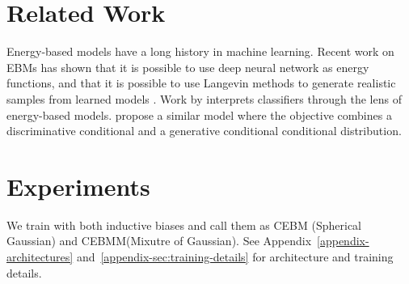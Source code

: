 \documentclass[tablecaption=bottom,wcp]{jmlr} %
\begin{document}


\vspace*{-0.5ex}
\section{Related Work}
\label{sec:related-work}
\vspace*{-1.5ex}
Energy-based models \cite{lecun2006tutorial} have a long history in machine learning. Recent work on EBMs has shown that it is possible to use deep neural network as energy functions, and that it is possible to use Langevin methods to generate realistic samples from learned models \cite{nijkamp2019anatomy, nijkamp2019learning, du2019implicit,xie2016theory}. Work by \citet{grathwohl2019your} interprets classifiers through the lens of energy-based models. \citet{liu2020hybrid} propose a similar model where the objective combines a discriminative conditional and a generative conditional conditional distribution.

\vspace*{-0.5ex}
\section{Experiments}
\label{sec:experiments}
We train with both inductive biases and call them as CEBM (Spherical Gaussian) and CEBMM(Mixutre of Gaussian). See Appendix~\ref{appendix-architectures} and~\ref{appendix-sec:training-details} for architecture and training details.
\end{document}
